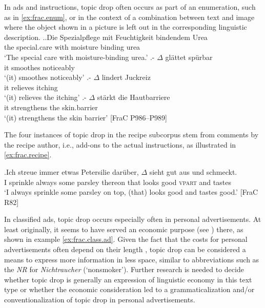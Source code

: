 In ads and instructions, topic drop often occurs as part of an enumeration, such as in \ref{ex:frac.enum}, or in the context of a combination between text and image where the object shown in a picture is left out in the corresponding linguistic description.
\ex.\label{ex:frac.enum}\ag.Die Spezialpflege mit Feuchtigkeit bindendem Urea\\
the special.care with moisture binding urea\\
`The special care with moisture-binding urea.'
\bg.- $\Delta$ glättet spürbar\\
{} it smoothes noticeably\\
`(it) smoothes noticeably'
\cg.- $\Delta$ lindert Juckreiz\\
{} it relieves itching\\
`(it) relieves the itching'
\dg.- $\Delta$ stärkt die Hautbarriere\\
{} it strengthens the skin.barrier\\
`(it) strengthens the skin barrier' [FraC P986--P989]

\largerpage[-1]
The four instances of topic drop in the recipe subcorpus stem from comments by the recipe author, i.e., add-ons to the actual instructions, as illustrated in \ref{ex:frac.recipe}.

\exg.\label{ex:frac.recipe}Ich streue immer etwas Petersilie darüber, $\Delta$ sieht gut aus und schmeckt.\\
I sprinkle always some parsley thereon that looks good \textsc{vpart} and tastes\\
`I always sprinkle some parsley on top, (that) looks good and tastes good.' [FraC R82]

In classified ads, topic drop occurs especially often in personal advertisements.
At least originally, it seems to have served an economic purpose (see ) there, as shown in example \ref{ex:frac.class.ad}.
Given the fact that the costs for personal advertisements often depend on their length \citep[e.g.,][98]{bachmann-stein2011}, topic drop can be considered a means to express more information in less space, similar to abbreviations such as the \textit{NR} for \textit{Nichtraucher} (`nonsmoker').
Further research is needed to decide whether topic drop is generally an expression of linguistic economy in this text type or whether the economic consideration led to a grammaticalization and/or conventionalization of topic drop in personal advertisements.

